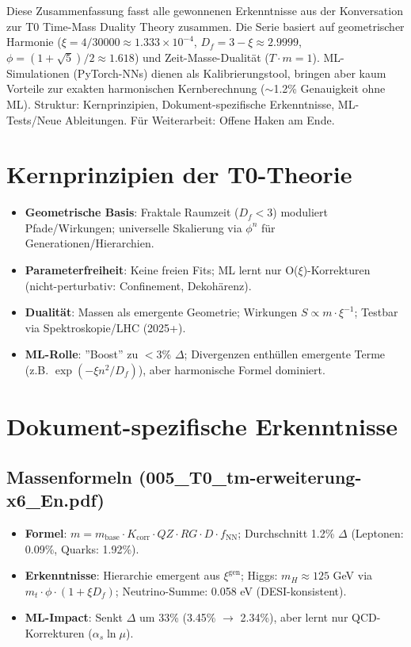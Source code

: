 Diese Zusammenfassung fasst alle gewonnenen Erkenntnisse aus der Konversation zur T0 Time-Mass Duality Theory zusammen. Die Serie basiert auf geometrischer Harmonie ($\xi = 4/30000 \approx 1.333\times10^{-4}$, $D_f = 3 - \xi \approx 2.9999$, $\phi = (1+\sqrt{5})/2 \approx 1.618$) und Zeit-Masse-Dualität ($T \cdot m = 1$). ML-Simulationen (PyTorch-NNs) dienen als Kalibrierungstool, bringen aber kaum Vorteile zur exakten harmonischen Kernberechnung ($\sim$1.2\% Genauigkeit ohne ML). Struktur: Kernprinzipien, Dokument-spezifische Erkenntnisse, ML-Tests/Neue Ableitungen. Für Weiterarbeit: Offene Haken am Ende.
	
	\section{Kernprinzipien der T0-Theorie}
	
	\begin{itemize}
		\item \textbf{Geometrische Basis}: Fraktale Raumzeit ($D_f < 3$) moduliert Pfade/Wirkungen; universelle Skalierung via $\phi^n$ für Generationen/Hierarchien.
		\item \textbf{Parameterfreiheit}: Keine freien Fits; ML lernt nur O($\xi$)-Korrekturen (nicht-perturbativ: Confinement, Dekohärenz).
		\item \textbf{Dualität}: Massen als emergente Geometrie; Wirkungen $S \propto m \cdot \xi^{-1}$; Testbar via Spektroskopie/LHC (2025+).
		\item \textbf{ML-Rolle}: ''Boost'' zu $<$3\% $\Delta$; Divergenzen enthüllen emergente Terme (z.B. $\exp(-\xi n^2 / D_f)$), aber harmonische Formel dominiert.
	\end{itemize}
	
	\section{Dokument-spezifische Erkenntnisse}
	
	\subsection{Massenformeln (005\_T0\_tm-erweiterung-x6\_En.pdf)}
	
	\begin{itemize}
		\item \textbf{Formel}: $m = m_\text{base} \cdot K_\text{corr} \cdot QZ \cdot RG \cdot D \cdot f_\text{NN}$; Durchschnitt 1.2\% $\Delta$ (Leptonen: 0.09\%, Quarks: 1.92\%).
		\item \textbf{Erkenntnisse}: Hierarchie emergent aus $\xi^\text{gen}$; Higgs: $m_H \approx 125$ GeV via $m_t \cdot \phi \cdot (1 + \xi D_f)$; Neutrino-Summe: 0.058 eV (DESI-konsistent).
		\item \textbf{ML-Impact}: Senkt $\Delta$ um 33\% (3.45\% $\to$ 2.34\%), aber lernt nur QCD-Korrekturen ($\alpha_s \ln \mu$).
	\end{itemize}
	
